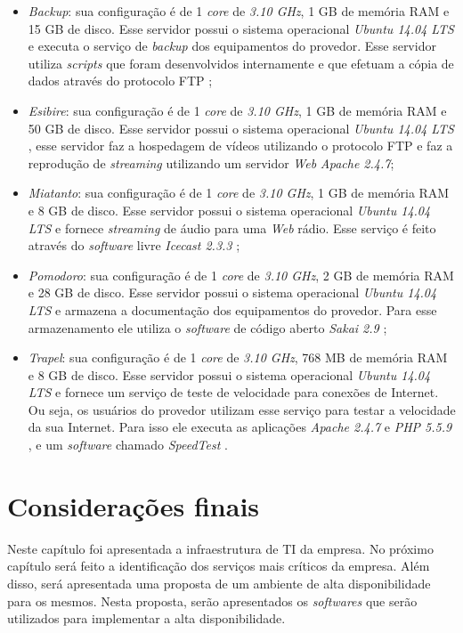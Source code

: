 \begin{itemize}
 \item \textit{Backup}: sua configuração é de 1 \textit{core} de \textit{3.10 GHz}, 1 GB de memória \ac{RAM} e 15 GB de disco. 
 Esse servidor possui o sistema operacional \textit{Ubuntu 14.04 \ac{LTS}} \cite{ubuntu} e executa o serviço de \textit{backup} dos equipamentos 
 do provedor. Esse servidor utiliza \textit{scripts} que foram desenvolvidos internamente e que efetuam a cópia de dados através do protocolo 
 \ac{FTP} \cite{kurose2006};
 
 \item \textit{Esibire}: sua configuração é de 1 \textit{core} de \textit{3.10 GHz}, 1 GB de memória \ac{RAM} e 50 GB de disco. 
 Esse servidor possui o sistema operacional \textit{Ubuntu 14.04 \ac{LTS}} \cite{ubuntu}, esse servidor faz a hospedagem de vídeos utilizando o 
 protocolo \ac{FTP} e faz a reprodução de \textit{streaming} utilizando um servidor \textit{Web} \textit{Apache 2.4.7};
 
 \item \textit{Miatanto}: sua configuração é de 1 \textit{core} de \textit{3.10 GHz}, 1 GB de memória \ac{RAM} e 8 GB de disco. 
 Esse servidor possui o sistema operacional \textit{Ubuntu 14.04 \ac{LTS}} \cite{ubuntu} e fornece \textit{streaming} de áudio para uma \textit{Web} 
 rádio. Esse serviço é feito através do \textit{software} livre \textit{Icecast 2.3.3} \cite{icecast};
 
 \item \textit{Pomodoro}: sua configuração é de 1 \textit{core} de \textit{3.10 GHz}, 2 GB de memória \ac{RAM} e 28 GB de disco. 
 Esse servidor possui o sistema operacional \textit{Ubuntu 14.04 \ac{LTS}} \cite{ubuntu} e armazena a documentação dos equipamentos do provedor. 
 Para esse armazenamento ele utiliza o \textit{software} de código aberto \textit{Sakai 2.9} \cite{sakai};
 
 \item \textit{Trapel}: sua configuração é de 1 \textit{core} de \textit{3.10 GHz}, 768 MB de memória \ac{RAM} e 8 GB de disco. 
 Esse servidor possui o sistema operacional \textit{Ubuntu 14.04 \ac{LTS}} \cite{ubuntu} e fornece um serviço de teste de velocidade para conexões 
 de Internet. Ou seja, os usuários do provedor utilizam esse serviço para testar a velocidade da sua Internet. Para isso ele executa as aplicações 
 \textit{Apache 2.4.7} \cite{apache} e \textit{\ac{PHP} 5.5.9} \cite{php}, e um \textit{software} chamado \textit{SpeedTest} \cite{speedtest}.
\end{itemize}

\section{Considerações finais}

Neste capítulo foi apresentada a infraestrutura de \ac{TI} da empresa. No próximo capítulo será feito a identificação dos serviços mais críticos 
da empresa. Além disso, será apresentada uma proposta de um ambiente de alta disponibilidade para os mesmos. Nesta proposta, serão apresentados 
os \textit{softwares} que serão utilizados para implementar a alta disponibilidade.

